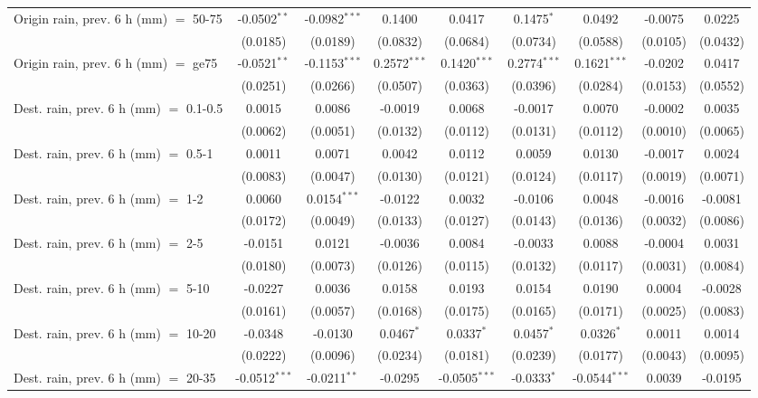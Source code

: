 \begin{tabular}{lcccccccc}
   Origin rain, prev. 6 h (mm) $=$ 50-75 & -0.0502$^{**}$ & -0.0982$^{***}$ & 0.1400 & 0.0417 & 0.1475$^{*}$ & 0.0492 & -0.0075 & 0.0225\\
    & (0.0185) & (0.0189) & (0.0832) & (0.0684) & (0.0734) & (0.0588) & (0.0105) & (0.0432)\\
   Origin rain, prev. 6 h (mm) $=$ ge75 & -0.0521$^{**}$ & -0.1153$^{***}$ & 0.2572$^{***}$ & 0.1420$^{***}$ & 0.2774$^{***}$ & 0.1621$^{***}$ & -0.0202 & 0.0417\\
    & (0.0251) & (0.0266) & (0.0507) & (0.0363) & (0.0396) & (0.0284) & (0.0153) & (0.0552)\\
   Dest. rain, prev. 6 h (mm) $=$ 0.1-0.5 & 0.0015 & 0.0086 & -0.0019 & 0.0068 & -0.0017 & 0.0070 & -0.0002 & 0.0035\\
    & (0.0062) & (0.0051) & (0.0132) & (0.0112) & (0.0131) & (0.0112) & (0.0010) & (0.0065)\\
   Dest. rain, prev. 6 h (mm) $=$ 0.5-1 & 0.0011 & 0.0071 & 0.0042 & 0.0112 & 0.0059 & 0.0130 & -0.0017 & 0.0024\\
    & (0.0083) & (0.0047) & (0.0130) & (0.0121) & (0.0124) & (0.0117) & (0.0019) & (0.0071)\\
   Dest. rain, prev. 6 h (mm) $=$ 1-2 & 0.0060 & 0.0154$^{***}$ & -0.0122 & 0.0032 & -0.0106 & 0.0048 & -0.0016 & -0.0081\\
    & (0.0172) & (0.0049) & (0.0133) & (0.0127) & (0.0143) & (0.0136) & (0.0032) & (0.0086)\\
   Dest. rain, prev. 6 h (mm) $=$ 2-5 & -0.0151 & 0.0121 & -0.0036 & 0.0084 & -0.0033 & 0.0088 & -0.0004 & 0.0031\\
    & (0.0180) & (0.0073) & (0.0126) & (0.0115) & (0.0132) & (0.0117) & (0.0031) & (0.0084)\\
   Dest. rain, prev. 6 h (mm) $=$ 5-10 & -0.0227 & 0.0036 & 0.0158 & 0.0193 & 0.0154 & 0.0190 & 0.0004 & -0.0028\\
    & (0.0161) & (0.0057) & (0.0168) & (0.0175) & (0.0165) & (0.0171) & (0.0025) & (0.0083)\\
   Dest. rain, prev. 6 h (mm) $=$ 10-20 & -0.0348 & -0.0130 & 0.0467$^{*}$ & 0.0337$^{*}$ & 0.0457$^{*}$ & 0.0326$^{*}$ & 0.0011 & 0.0014\\
    & (0.0222) & (0.0096) & (0.0234) & (0.0181) & (0.0239) & (0.0177) & (0.0043) & (0.0095)\\
   Dest. rain, prev. 6 h (mm) $=$ 20-35 & -0.0512$^{***}$ & -0.0211$^{**}$ & -0.0295 & -0.0505$^{***}$ & -0.0333$^{*}$ & -0.0544$^{***}$ & 0.0039 & -0.0195\\

\end{tabular}
